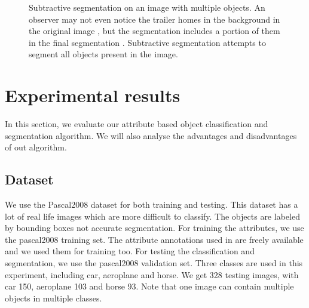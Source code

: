\documentclass[10pt,twocolumn,letterpaper]{article}
\begin{document}
\begin{figure}
\centering
{}
 \caption{Subtractive segmentation on an image with multiple objects.
An observer may not even notice the trailer homes in the background in
the original image ,
but the segmentation includes a portion of them in the final segmentation .
Subtractive segmentation attempts to segment all objects present
in the image.}
\label{fig:sub1}
\end{figure}

\section{Experimental results}
\label{sec:results}


In this section, we evaluate our attribute based object classification
and segmentation algorithm. We will also analyse the advantages and disadvantages of out algorithm.\\

\subsection{Dataset}
\label{ssec:dataset}

We use the Pascal2008 dataset for both training and testing. This dataset has a lot of real life
images which are more difficult to classify. The objects are labeled
by bounding boxes not accurate segmentation. For training the
attributes, we use the pascal2008 training set. The attribute
annotations used in \cite{farhadi09} are freely available and we
used them for training too. For testing the classification and
segmentation, we use the pascal2008 validation set. Three classes are used in this experiment, including car,
aeroplane and horse. We get 328 testing images, with car 150, aeroplane 103 and horse 93. Note that one image 
can contain multiple objects in multiple classes.\\
\end{document}
